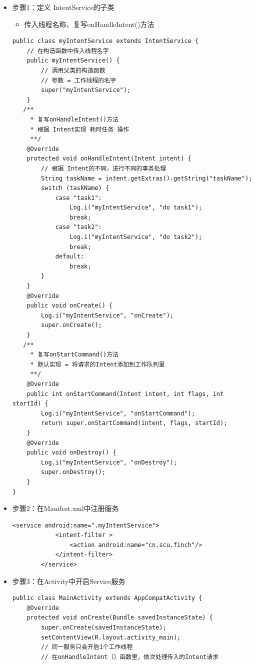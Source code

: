 \documentclass[9pt, b5paper]{article}
\begin{document}
\begin{itemize}
\item 步骤1：定义 IntentService的子类
\begin{itemize}
\item 传入线程名称、复写onHandleIntent()方法
\end{itemize}
\begin{verbatim}
public class myIntentService extends IntentService {
    // 在构造函数中传入线程名字
    public myIntentService() {
        // 调用父类的构造函数
        // 参数 = 工作线程的名字
        super("myIntentService");
    }
   /** 
     * 复写onHandleIntent()方法
     * 根据 Intent实现 耗时任务 操作
     **/  
    @Override
    protected void onHandleIntent(Intent intent) {
        // 根据 Intent的不同，进行不同的事务处理
        String taskName = intent.getExtras().getString("taskName");
        switch (taskName) {
            case "task1":
                Log.i("myIntentService", "do task1");
                break;
            case "task2":
                Log.i("myIntentService", "do task2");
                break;
            default:
                break;
        }
    }
    @Override
    public void onCreate() {
        Log.i("myIntentService", "onCreate");
        super.onCreate();
    }
   /** 
     * 复写onStartCommand()方法
     * 默认实现 = 将请求的Intent添加到工作队列里
     **/  
    @Override
    public int onStartCommand(Intent intent, int flags, int startId) {
        Log.i("myIntentService", "onStartCommand");
        return super.onStartCommand(intent, flags, startId);
    }
    @Override
    public void onDestroy() {
        Log.i("myIntentService", "onDestroy");
        super.onDestroy();
    }
}
\end{verbatim}
\item 步骤2：在Manifest.xml中注册服务
\begin{verbatim}
<service android:name=".myIntentService">
            <intent-filter >
                <action android:name="cn.scu.finch"/>
            </intent-filter>
        </service>
\end{verbatim}
\item 步骤3：在Activity中开启Service服务
\begin{verbatim}
public class MainActivity extends AppCompatActivity {
    @Override
    protected void onCreate(Bundle savedInstanceState) {
        super.onCreate(savedInstanceState);
        setContentView(R.layout.activity_main);
        // 同一服务只会开启1个工作线程
        // 在onHandleIntent（）函数里，依次处理传入的Intent请求

\end{verbatim}
\end{itemize}
\end{document}
